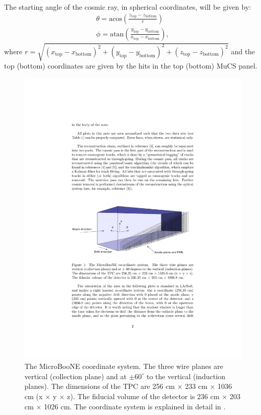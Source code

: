 \documentclass[a4paper]{scrartcl}
\begin{document}
The starting angle of the cosmic ray, in spherical coordinates, will be given by:
\begin{align}
  \theta = \mathrm{acos}\left(\frac{z_{\mathrm{top}}-z_{\mathrm{bottom}}}{r}\right) \\
  \phi = \mathrm{atan}\left(\frac{y_{\mathrm{top}}-y_{\mathrm{bottom}}}{x_{\mathrm{top}}-x_{\mathrm{bottom}}}\right),
\end{align}
where $r = \sqrt{(x_{\mathrm{top}}-x_{\mathrm{bottom}})^2+(y_{\mathrm{top}}-y_{\mathrm{bottom}})^2+(z_{\mathrm{top}}-z_{\mathrm{bottom}})^2}$ and the top (bottom) coordinates are given by the hits in the top (bottom) MuCS panel.
\begin{figure}[htbp]
  \begin{center}
    \includegraphics[width=0.8\linewidth]{figures/coord.pdf}

    \caption{The MicroBooNE coordinate system. The three wire planes are vertical (collection plane) and at  $\pm60^{\circ}$ to the vertical (induction planes). The dimensions of the TPC are 256 cm $\times$ 233 cm $\times$ 1036 cm (x $\times$ y $\times$ z). The fiducial volume of the detector is 236 cm $\times$ 203 cm $\times$ 1026 cm. The coordinate system is explained in detail in \cite{mcdata}.} \label{fig:coord}
  \end{center}
\end{figure}
\end{document}
